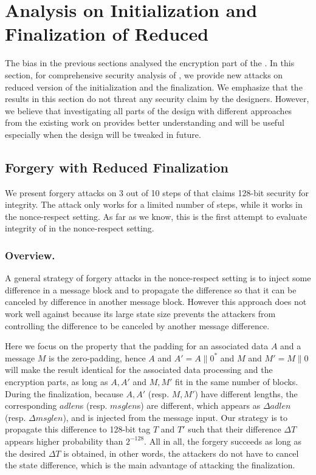 
\section{Analysis on Initialization and Finalization of Reduced \MORUS}
\label{sec/IniFin}

The bias in the previous sections analysed the encryption part of the \MORUS. In this section, for comprehensive security analysis of \MORUS, we provide new attacks on reduced version of the initialization and the finalization. We emphasize that the results in this section do not threat any security claim by the designers. However, we believe that investigating all parts of the design with different approaches from the existing work on \MORUS provides better understanding and will be useful especially when the design will be tweaked in future.

\subsection{Forgery with Reduced Finalization}
\label{subsec/Fin}
We present forgery attacks on 3 out of 10 steps of \MORUS[1280] that claims 128-bit security for integrity. The attack only works for a limited number of steps, while it works in the nonce-respect setting. As far as we know, this is the first attempt to evaluate integrity of \MORUS in the nonce-respect setting.

\subsubsection{Overview.}
A general strategy of forgery attacks in the nonce-respect setting is to inject some difference in a message block and to propagate the difference so that it can be canceled by difference in another message block. However this approach does not work well against \MORUS because its large state size prevents the attackers from controlling the difference to be canceled by another message difference.

Here we focus on the property that the padding for an associated data $A$ and a message $M$ is the zero-padding, hence $A$ and $A'=A\|0^*$ and $M$ and $M'=M\|0$ will make the result identical for the associated data processing and the encryption parts, as long as $A,A'$ and $M,M'$ fit in the same number of blocks. During the finalization, because $A,A'$ (resp. $M,M'$) have different lengths, the corresponding $adlen$s (resp. $msglen$s) are different, which appears as $\Delta adlen$ (resp. $\Delta msglen$), and is injected from the message input. Our strategy is to propagate this difference to 128-bit tag $T$ and $T'$ such that their difference $\Delta T$ appears higher probability than $2^{-128}$. All in all, the forgery succeeds as long as the desired $\Delta T$ is obtained, in other words, the attackers do not have to cancel the state difference, which is the main advantage of attacking the finalization.

